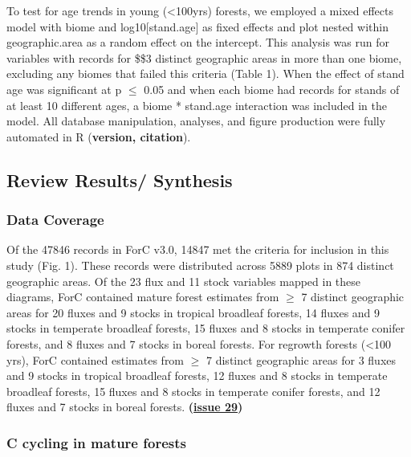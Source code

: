 \documentclass[
]{article}
\begin{document}
To test for age trends in young (\textless100yrs) forests, we employed a
mixed effects model with biome and log10{[}stand.age{]} as fixed effects
and plot nested within geographic.area as a random effect on the
intercept. This analysis was run for variables with records for \$\ge\$3
distinct geographic areas in more than one biome, excluding any biomes
that failed this criteria (Table 1). When the effect of stand age was
significant at p \(\le\) 0.05 and when each biome had records for stands
of at least 10 different ages, a biome * stand.age interaction was
included in the model. All database manipulation, analyses, and figure
production were fully automated in R (\textbf{version, citation}).

\hypertarget{review-results-synthesis}{%
\subsection{Review Results/ Synthesis}\label{review-results-synthesis}}

\hypertarget{data-coverage}{%
\subsubsection{Data Coverage}\label{data-coverage}}

Of the 47846 records in ForC v3.0, 14847 met the criteria for inclusion
in this study (Fig. 1). These records were distributed across 5889 plots
in 874 distinct geographic areas. Of the 23 flux and 11 stock variables
mapped in these diagrams, ForC contained mature forest estimates from
\(\ge\) 7 distinct geographic areas for 20 fluxes and 9 stocks in
tropical broadleaf forests, 14 fluxes and 9 stocks in temperate
broadleaf forests, 15 fluxes and 8 stocks in temperate conifer forests,
and 8 fluxes and 7 stocks in boreal forests. For regrowth forests
(\textless100 yrs), ForC contained estimates from \(\ge\) 7 distinct
geographic areas for 3 fluxes and 9 stocks in tropical broadleaf
forests, 12 fluxes and 8 stocks in temperate broadleaf forests, 15
fluxes and 8 stocks in temperate conifer forests, and 12 fluxes and 7
stocks in boreal forests.
\textbf{(\href{https://github.com/forc-db/ERL-review/issues/29\#issuecomment-699633801}{issue
29})}

\hypertarget{c-cycling-in-mature-forests}{%
\subsubsection{C cycling in mature
forests}\label{c-cycling-in-mature-forests}}
\end{document}
